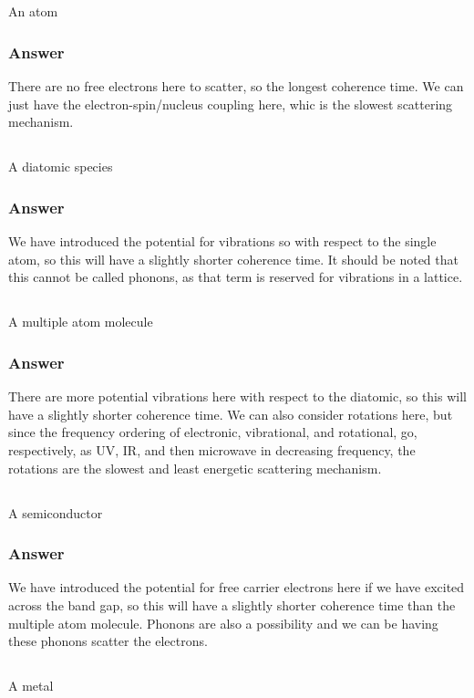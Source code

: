 \documentclass[12pt]{article}
\begin{document}
\subsection{}
An atom
\subsubsection{Answer}
There are no free electrons here to scatter, so the longest coherence time. We can just have the electron-spin/nucleus coupling here, whic is the slowest scattering mechanism.
\subsection{}
A diatomic species
\subsubsection{Answer}
We have introduced the potential for vibrations so with respect to the single atom, so this will have a slightly shorter coherence time. It should be noted that this cannot be called phonons, as that term is reserved for vibrations in a lattice.
\subsection{}
A multiple atom molecule
\subsubsection{Answer}
There are more potential vibrations here with respect to the diatomic, so this will have a slightly shorter coherence time. We can also consider rotations here, but since the frequency ordering of electronic, vibrational, and rotational, go, respectively, as UV, IR, and then microwave in decreasing frequency, the rotations are the slowest and least energetic scattering mechanism.
\subsection{}
A semiconductor
\subsubsection{Answer}
We have introduced the potential for free carrier electrons here if we have excited across the band gap, so this will have a slightly shorter coherence time than the multiple atom molecule. Phonons are also a possibility and we can be having these phonons scatter the electrons.
\subsection{}
A metal
\end{document}
